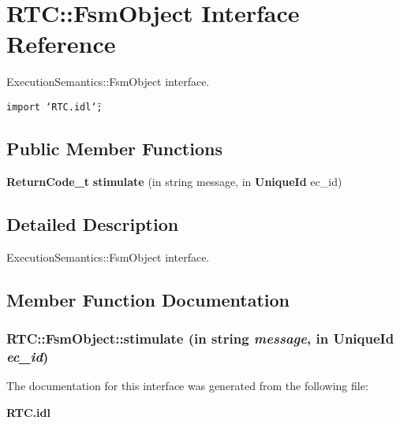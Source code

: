 \section{RTC::Fsm\-Object Interface Reference}
\label{interfaceRTC_1_1FsmObject}
Execution\-Semantics::Fsm\-Object interface.  


{\tt import \char`\"{}RTC.idl\char`\"{};}

\subsection*{Public Member Functions}
\begin{CompactItemize}
\item 
{\bf Return\-Code\_\-t} {\bf stimulate} (in string message, in {\bf Unique\-Id} ec\_\-id)
\end{CompactItemize}


\subsection{Detailed Description}
Execution\-Semantics::Fsm\-Object interface. 



\subsection{Member Function Documentation}
\subsubsection{ RTC::Fsm\-Object::stimulate (in string {\em message}, in {\bf Unique\-Id} {\em ec\_\-id})}\label{interfaceRTC_1_1FsmObject_RTC_1_1FsmObjecta0}




The documentation for this interface was generated from the following file:\begin{CompactItemize}
\item 
{\bf RTC.idl}\end{CompactItemize}
